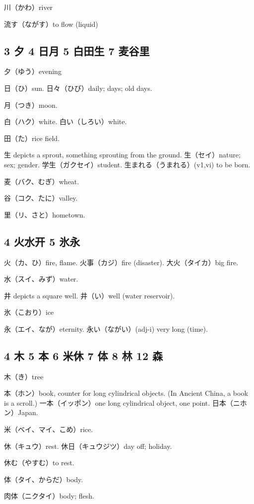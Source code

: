 川（かわ）river

流す（ながす）to flow (liquid)

\subsection{3 夕 4 日月 5 白田生 7 麦谷里}

夕（ゆう）evening

日（ひ）sun.
日々（ひび）daily; days; old days.

月（つき）moon.

白（ハク）white.
白い（しろい）white.

田（た）rice field.

生 depicts a sprout, something sprouting from the ground.
生（セイ）nature; sex; gender.
学生（ガクセイ）student.
生まれる（うまれる）(v1,vi) to be born.

麦（バク、むぎ）wheat.

谷（コク、たに）valley.

里（リ、さと）hometown.

\subsection{4 火水开 5 氷永}

火（カ、ひ）fire, flame.
火事（カジ）fire (disaster).
大火（タイカ）big fire.

水（スイ、みず）water.

井 depicts a square well.
井（い）well (water reservoir).

氷（こおり）ice

永（エイ、なが）eternity.
永い（ながい）(adj-i) very long (time).

\subsection{4 木 5 本 6 米休 7 体 8 林 12 森}

木（き）tree

本（ホン）book, counter for long cylindrical objects.
(In Ancient China, a book is a scroll.)
一本（イッポン）one long cylindrical object, one point.
日本（ニホン）Japan.

米（ベイ、マイ、こめ）rice.

休（キュウ）rest.
休日（キュウジツ）day off; holiday.

休む（やすむ）to rest.

体（タイ、からだ）body.

肉体（ニクタイ）body; flesh.

